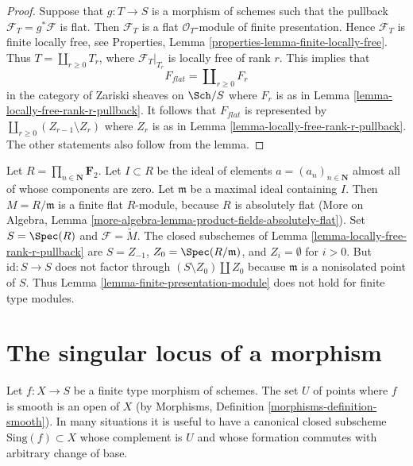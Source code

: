 \begin{proof}
Suppose that $g : T \to S$ is a morphism of schemes such that the pullback
$\mathcal{F}_T = g^*\mathcal{F}$ is flat. Then $\mathcal{F}_T$ is a flat
$\mathcal{O}_T$-module of finite presentation. Hence
$\mathcal{F}_T$ is finite locally free, see
Properties, Lemma \ref{properties-lemma-finite-locally-free}.
Thus $T = \coprod_{r \geq 0} T_r$, where $\mathcal{F}_T|_{T_r}$ is locally
free of rank $r$. This implies that
$$
F_{flat} = \coprod\nolimits_{r \geq 0} F_r
$$
in the category of Zariski sheaves on $\Sch/S$ where $F_r$ is as in
Lemma \ref{lemma-locally-free-rank-r-pullback}. It follows
that $F_{flat}$ is represented by
$\coprod_{r \geq 0} (Z_{r - 1} \setminus Z_r)$ where
$Z_r$ is as in
Lemma \ref{lemma-locally-free-rank-r-pullback}.
The other statements also follow from the lemma.
\end{proof}

\begin{example}
\label{example-not-fp-MB}
Let $R = \prod_{n \in \mathbf{N}} \mathbf{F}_2$. Let $I \subset R$
be the ideal of elements $a = (a_n)_{n \in \mathbf{N}}$ almost all of whose
components are zero. Let $\mathfrak m$ be a maximal ideal containing $I$. 
Then $M = R/\mathfrak m$ is a finite flat $R$-module, because $R$ is absolutely
flat (More on Algebra, Lemma
\ref{more-algebra-lemma-product-fields-absolutely-flat}).
Set $S = \Spec(R)$ and $\mathcal{F} = \widetilde{M}$.
The closed subschemes of Lemma \ref{lemma-locally-free-rank-r-pullback} are
$S = Z_{-1}$, $Z_0 = \Spec(R/\mathfrak m)$, and $Z_i = \emptyset$ for $i > 0$.
But $\text{id} : S \to S$ does not factor through
$(S \setminus Z_0) \amalg Z_0$ because $\mathfrak m$ is a nonisolated
point of $S$. Thus
Lemma \ref{lemma-finite-presentation-module}
does not hold for finite type modules.
\end{example}







\section{The singular locus of a morphism}
\label{section-singular-locus-morphism}

\noindent
Let $f : X \to S$ be a finite type morphism of schemes. The set $U$ of points
where $f$ is smooth is an open of $X$
(by Morphisms, Definition \ref{morphisms-definition-smooth}).
In many situations it is useful to have a canonical closed
subscheme $\text{Sing}(f) \subset X$ whose complement is $U$
and whose formation commutes with arbitrary change of base.

